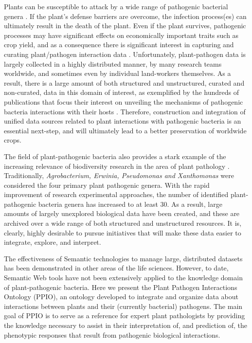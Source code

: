\documentclass[sw]{iosart2c}
\begin{document}
Plants can be susceptible to attack by a wide range of pathogenic bacterial genera \cite{Bull2010}. If the plant's defense barriers are overcome, the infection process(es) can ultimately result in the death of the plant. Even if the plant survives, pathogenic processes may have significant effects on economically important traits such as crop yield, and as a consequence there is significant interest in capturing and curating plant/pathogen interaction data \cite{Montesinos}. Unfortunately, plant-pathogen data is largely collected in a highly distributed manner, by many research teams worldwide, and sometimes even by individual land-workers themselves.  As a result, there is a large amount of both structured and unstructured, curated and non-curated, data in this domain of interest, as exemplified by the hundreds of publications that focus their interest on unveiling the mechanisms of pathogenic bacteria interactions with their hosts \cite{DeWit,Dodds}. Therefore, construction and integration of unified data sources related to plant interactions with pathogenic bacteria is an essential next-step, and will ultimately lead to a better preservation of worldwide crops.

The field of plant-pathogenic bacteria also provides a stark example of the increasing relevance of biodiversity research in the area of plant pathology \cite{Mansfield}. Traditionally, {\itshape Agrobacterium, Erwinia, Pseudomonas and Xanthomonas} were considered the four primary plant pathogenic genera. With the rapid improvement of research experimental approaches, the number of identified plant-pathogenic bacteria genera has increased to at least 30. As a result, large amounts of largely unexplored biological data have been created, and these are archived over a wide range of both structured and unstructured resources. It is, clearly, highly desirable to pursue initiatives that will make these data easier to integrate, explore, and interpret.

The effectiveness of Semantic technologies to manage large, distributed datasets has been demonstrated in other areas of the life sciences. However, to date, Semantic Web tools have not been extensively applied to the knowledge domain of plant-pathogenic bacteria. Here we present the Plant Pathogen Interactions Ontology (PPIO), an ontology developed to integrate and organize data about interactions between plants and their (currently bacterial) pathogens. The main goal of PPIO is to serve as a reference for expert plant pathologists by providing the knowledge necessary to assist in their interpretation of, and prediction of, the phenotypic responses that result from pathogenic biological interactions.
\end{document}
